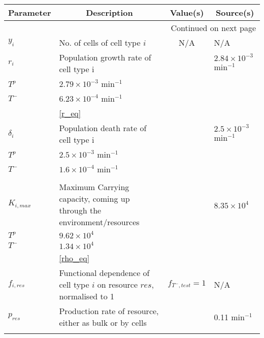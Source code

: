 \newpage
\begin{longtable}[c]{|l|p{4.3cm}|c|p{2.3cm}|}

  \hline \multicolumn{1}{|c|}{\textbf{Parameter}} & \multicolumn{1}{c|}{\textbf{Description}} & \multicolumn{1}{c|}{\textbf{Value(s)}} & \multicolumn{1}{c|}{\textbf{Source(s)}}\\ \hline
  \endhead

  \hline \multicolumn{4}{|r|}{{Continued on next page}} \\ \hline
  \endfoot

  \endlastfoot

  $y_i$ & No. of cells of cell type $i$ & N/A & N/A  \\ \hline
  $r_i$ & Population growth rate of cell type i  &
  \begin{tabular}{l|l}
    $T^+$ & $2.84 \times 10^{-3}$ \tiny{min$^{-1}$}\\
    $T^p$ & $2.79 \times 10^{-3}$ \tiny{min$^{-1}$}\\
    $T^-$ & $6.23 \times 10^{-4}$ \tiny{min$^{-1}$}\\
  \end{tabular}
  & \autoref{r_eq} \\ \hline
  $\delta_i$  & Population death rate of cell type i &
  \begin{tabular}{l|l}
    $T^+$ & $2.5 \times 10^{-3}$ \tiny{min$^{-1}$}\\
    $T^p$ & $2.5 \times 10^{-3}$ \tiny{min$^{-1}$}\\
    $T^-$ & $1.6 \times 10^{-4}$ \tiny{min$^{-1}$}\\
  \end{tabular}
  & \cite{Jain}  \\ \hline
  $K_{i,max}$ & Maximum Carrying capacity, coming up through the environment/resources &
  \begin{tabular}{l|l}
    $T^+$ & $8.35 \times 10^4$ \\
    $T^p$ & $9.62 \times 10^4$ \\
    $T^-$ & $1.34 \times 10^4$ \\
  \end{tabular}
  & \autoref{rho_eq} \\ \hline
  $f_{i,res}$ & Functional dependence of cell type $i$ on resource $res$, normalised to 1 & $f_{T^-,test}=1$ & N/A \\ \hline
  $p_{res}$ & Production rate of resource, either as bulk or by cells &
  \begin{tabular}{l|l}
    $O_2$ & 0.11 \tiny{min$^{-1}$}\\

\end{tabular}
\end{longtable}

